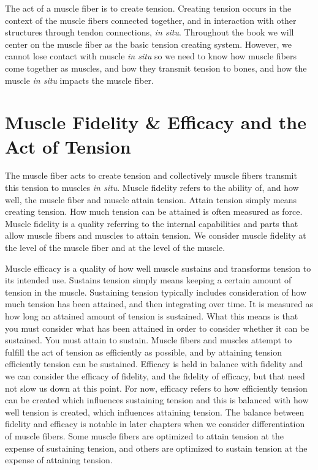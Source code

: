 The act of a muscle fiber is to create tension. Creating tension occurs in the context of the muscle fibers connected together, and in interaction with other structures through tendon connections, \textit{in situ}. Throughout the book we will center on the muscle fiber as the basic tension creating system. However, we cannot lose contact with muscle \textit{in situ} so we need to know how muscle fibers come together as muscles, and how they transmit tension to bones, and how the muscle \textit{in situ}  impacts the muscle fiber.

\section{Muscle Fidelity \& Efficacy and the Act of Tension}

The muscle fiber acts to create tension and collectively muscle fibers transmit this tension to muscles \textit{in situ}. Muscle fidelity refers to the ability of, and how well, the muscle fiber and muscle attain tension. Attain tension simply means creating tension. How much tension can be attained is often measured as force. Muscle fidelity is a quality referring to the internal capabilities and parts that allow muscle fibers and muscles to attain tension. We consider muscle fidelity at the level of the muscle fiber and at the level of the muscle. 

Muscle efficacy is a quality of how well muscle sustains and transforms tension to its intended use. Sustains tension simply means keeping a certain amount of tension in the muscle. Sustaining tension typically includes consideration of how much tension has been attained, and then integrating over time. It is measured as how long an attained amount of tension is sustained. What this means is that you must consider what has been attained in order to consider whether it can be sustained. You must attain to sustain. Muscle fibers and muscles attempt to fulfill the act of tension as efficiently as possible, and by attaining tension efficiently tension can be sustained. Efficacy is held in balance with fidelity and we can consider the efficacy of fidelity, and the fidelity of efficacy, but that need not slow us down at this point. For now, efficacy refers to how efficiently tension can be created which influences sustaining tension and this is balanced with how well tension is created, which influences attaining tension. The balance between fidelity and efficacy is notable in later chapters when we consider differentiation of muscle fibers. Some muscle fibers are optimized to attain tension at the expense of sustaining tension, and others are optimized to sustain tension at the expense of attaining tension. 

